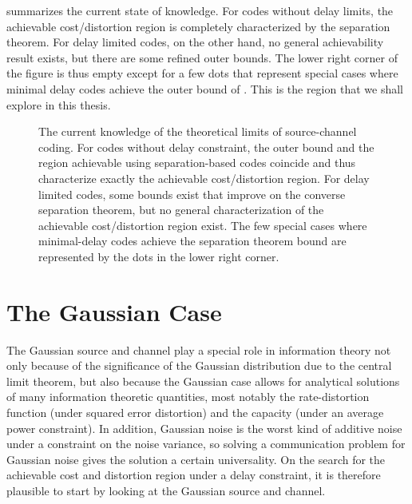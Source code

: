  summarizes the current state of knowledge. For codes
without delay limits, the achievable cost/distortion region is completely
characterized by the separation theorem. For delay limited
codes, on the other hand, no general achievability result exists, but there are
some refined outer bounds. The lower right corner of the figure is thus empty
except for a few dots that represent special cases where minimal delay codes
achieve the outer bound of . This is the region that
we shall explore in this thesis. 

\begin{figure}
  \begin{center}
    
  \end{center}
  \caption{The current knowledge of the theoretical limits of source-channel
  coding. For codes without delay constraint, the outer bound and the
  region achievable using separation-based codes coincide and thus characterize
  exactly the achievable cost/distortion region. For delay limited codes, some
  bounds exist that improve on the converse separation theorem, but no general
  characterization of the achievable cost/distortion region exist. The few
  special cases where minimal-delay codes achieve the separation theorem bound
  are represented by the dots in the lower right corner.}
  \label{fig:achievableregions}
\end{figure}


\section{The Gaussian Case}\label{sec:gaussian}

The Gaussian source and channel play a special role in information theory not
only because of the significance of the Gaussian distribution due to the central
limit theorem, but also because the Gaussian case allows for analytical
solutions of many information theoretic quantities, most notably the
rate-distortion function (under squared error distortion) and the capacity
(under an average power constraint). In addition, Gaussian noise is the worst
kind of additive noise under a constraint on the noise variance, so solving a
communication problem for Gaussian noise gives the solution a certain
universality. On the search for the achievable cost and distortion region under
a delay constraint, it is therefore plausible to start by looking at the
Gaussian source and channel. 

